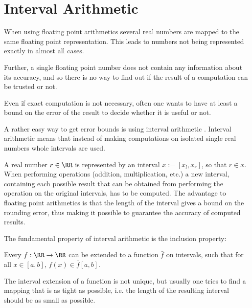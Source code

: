 \section{Interval Arithmetic}
	When using floating point arithmetics several real numbers are mapped to the
  same floating point representation. 
  This leads to numbers not being represented exactly in almost all cases.

	Further, a single floating point number does not contain any information
  about its accuracy, and so there is no way to find out if the result of a
  computation can be trusted or not.

  Even if exact computation is not necessary, often one wants to have at least
  a bound on the error of the result to decide whether it is useful or not.
    
  A rather easy way to get error bounds is using interval arithmetic
  \cite{Kearfott1996}.
  Interval arithmetic means that instead of making computations on isolated single real numbers whole
  intervals are used.

	A real number $r \in \RR$ is represented by an interval $x := [x_l,x_r]$, so that $r \in x$.
  When performing operations (addition, multiplication, etc.) a new interval,
  containing each possible result that can be obtained from performing the
  operation on the original intervals, has to be computed.
	The advantage to floating point arithmetics is that the length of the interval gives a bound on the rounding error, 
	thus making it possible to guarantee the accuracy of computed results.

	The fundamental property of interval arithmetic is the inclusion property:

	Every $f: \RR \to \RR$ can be extended to a function $\bar f$ on intervals, such that for all $x \in [a,b]$, $f(x) \in \bar f[a,b]$. 

	The interval extension of a function is not unique, but usually one tries to
  find a mapping that is as tight as possible, i.e. the length of the resulting interval
  should be as small as possible.
  
